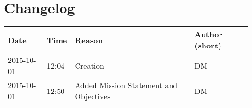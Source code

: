 \chapter{Changelog}

\begin{table}[h]
	\begin{tabularx}{\textwidth}{llll}
		Date & Time & Reason & Author (short)\\
		\toprule
		2015-10-01 & 12:04 & Creation & DM\\
		2015-10-01 & 12:50 & Added Mission Statement and Objectives & DM\\
	\end{tabularx}
\end{table}

